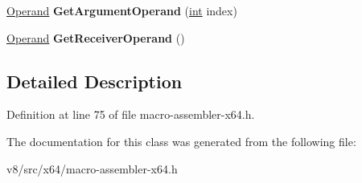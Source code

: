 \begin{DoxyCompactItemize}
\item 
\mbox{\label{classv8_1_1internal_1_1StackArgumentsAccessor_a82ed78b063e9ba4505f28c7a34eef84f}} 
\mbox{\hyperlink{classv8_1_1internal_1_1Operand}{Operand}} {\bfseries Get\+Argument\+Operand} (\mbox{\hyperlink{classint}{int}} index)
\item 
\mbox{\label{classv8_1_1internal_1_1StackArgumentsAccessor_abece12018b51faf6f44830de1544d619}} 
\mbox{\hyperlink{classv8_1_1internal_1_1Operand}{Operand}} {\bfseries Get\+Receiver\+Operand} ()
\end{DoxyCompactItemize}


\subsection{Detailed Description}


Definition at line 75 of file macro-\/assembler-\/x64.\+h.



The documentation for this class was generated from the following file\+:\begin{DoxyCompactItemize}
\item 
v8/src/x64/macro-\/assembler-\/x64.\+h\end{DoxyCompactItemize}
